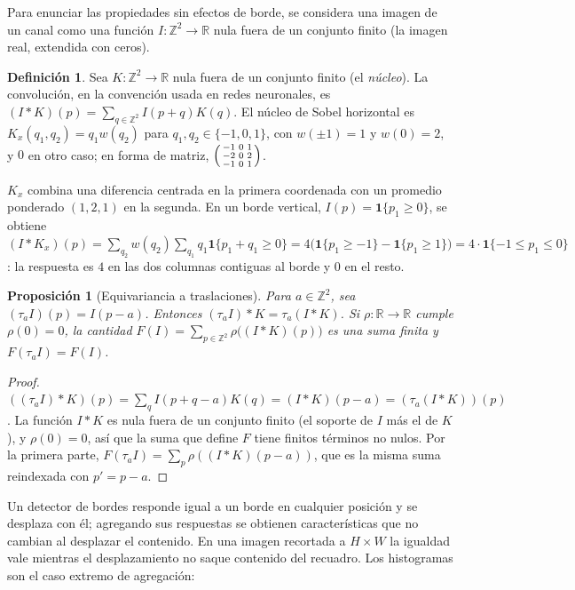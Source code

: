 \documentclass[11pt,a4paper]{article}
\theoremstyle{plain}
\newtheorem{proposicion}[teorema]{Proposición}
\theoremstyle{definition}
\newtheorem{definicion}[teorema]{Definición}
\theoremstyle{remark}
\newcommand{\R}{\mathbb{R}}
\newcommand{\Z}{\mathbb{Z}}
\newcommand{\1}{\mathbf{1}}
\newcommand{\ind}[1]{\mathbf{1}\{#1\}}
\begin{document}
Para enunciar las propiedades sin efectos de borde, se considera una
imagen de un canal como una función $I:\Z^2\to\R$ nula fuera de un
conjunto finito (la imagen real, extendida con ceros).

\begin{definicion}
Sea $K:\Z^2\to\R$ nula fuera de un conjunto finito (el \emph{núcleo}). La
convolución, en la convención usada en redes neuronales, es
$(I*K)(p)=\sum_{q\in\Z^2}I(p+q)K(q)$. El núcleo de Sobel horizontal es
$K_x(q_1,q_2)=q_1w(q_2)$ para $q_1,q_2\in\{-1,0,1\}$, con $w(\pm1)=1$ y
$w(0)=2$, y $0$ en otro caso; en forma de matriz,
$\begin{psmallmatrix}-1&0&1\\-2&0&2\\-1&0&1\end{psmallmatrix}$.
\end{definicion}

$K_x$ combina una diferencia centrada en la primera coordenada con un
promedio ponderado $(1,2,1)$ en la segunda. En un borde vertical,
$I(p)=\ind{p_1\ge0}$, se obtiene
$(I*K_x)(p)=\sum_{q_2}w(q_2)\sum_{q_1}q_1\ind{p_1+q_1\ge0}
=4\bigl(\ind{p_1\ge-1}-\ind{p_1\ge1}\bigr)=4\cdot\ind{-1\le p_1\le0}$: la
respuesta es $4$ en las dos columnas contiguas al borde y $0$ en el resto.

\begin{proposicion}[Equivariancia a traslaciones]\label{prop:equiv}
Para $a\in\Z^2$, sea $(\tau_aI)(p)=I(p-a)$. Entonces
$(\tau_aI)*K=\tau_a(I*K)$. Si $\rho:\R\to\R$ cumple $\rho(0)=0$, la
cantidad $F(I)=\sum_{p\in\Z^2}\rho\bigl((I*K)(p)\bigr)$ es una suma finita
y $F(\tau_aI)=F(I)$.
\end{proposicion}

\begin{proof}
$((\tau_aI)*K)(p)=\sum_qI(p+q-a)K(q)=(I*K)(p-a)=(\tau_a(I*K))(p)$. La
función $I*K$ es nula fuera de un conjunto finito (el soporte de $I$ más
el de $K$), y $\rho(0)=0$, así que la suma que define $F$ tiene finitos
términos no nulos. Por la primera parte,
$F(\tau_aI)=\sum_p\rho((I*K)(p-a))$, que es la misma suma reindexada con
$p'=p-a$.
\end{proof}

Un detector de bordes responde igual a un borde en cualquier posición y
se desplaza con él; agregando sus respuestas se obtienen características
que no cambian al desplazar el contenido. En una imagen recortada a
$H\times W$ la igualdad vale mientras el desplazamiento no saque contenido
del recuadro. Los histogramas son el caso extremo de agregación:
\end{document}
